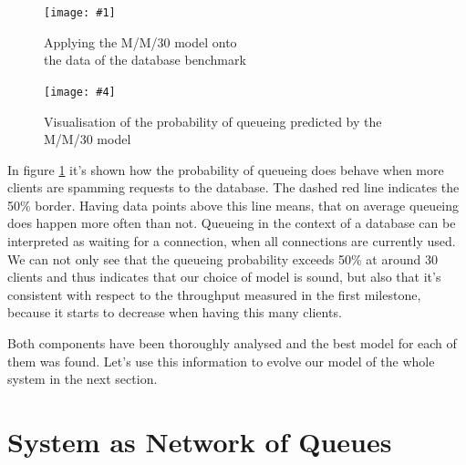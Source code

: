 \documentclass[11pt]{article}
\newcommand\TwoFig[6]{%
	\sbox\IBoxA{\texttt{[image: \#1]}}
	\sbox\IBoxB{\texttt{[image: \#4]}}%
	\ifdim\ht\IBoxA>\ht\IBoxB
	\setlength\IHeight{\ht\IBoxB}\else\setlength\IHeight{\ht\IBoxA}\fi%
	\begin{figure}[!htb]
		\minipage[t]{0.5\textwidth}\centering
		\texttt{[image: \#1]}
		\caption{#2}\label{#3}
		\endminipage \hfill
		\minipage[t]{0.5\textwidth}\centering
		\texttt{[image: \#4]}
		\caption{#5}\label{#6}
		\endminipage
	\end{figure}%
}
\begin{document}
\TwoFig {figures/database/mm30} {Applying the M/M/30 model onto\\ the data of the database benchmark} {fig:mm30}
		{figures/database/qprob} {Visualisation of the probability of queueing predicted by the M/M/30 model} {fig:qprob}
In figure \ref{fig:qprob} it's shown how the probability of queueing does behave when more clients are spamming requests to the database. The dashed red line indicates the 50\% border. Having data points above this line means, that on average queueing does happen more often than not. Queueing in the context of a database can be interpreted as waiting for a connection, when all connections are currently used. We can not only see that the queueing probability exceeds 50\% at around 30 clients and thus indicates that our choice of model is sound, but also that it's consistent with respect to the throughput measured in the first milestone, because it starts to decrease when having this many clients.

Both components have been thoroughly analysed and the best model for each of them was found. Let's use this information to evolve our model of the whole system in the next section.

\section{System as Network of Queues}\label{sec:network-of-queues}
\end{document}

